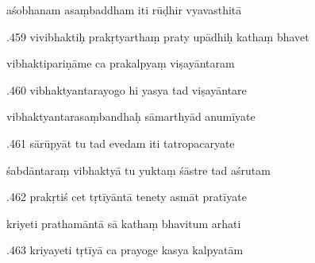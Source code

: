 \documentclass[article,12pt,a4paper]{memoir}%
\newcounter{parCount}
\begin{document}
	  
	  \pstart \leavevmode%
	aśobhanam asaṃbaddham iti rūḍhir vyavasthitā 
	{}
	\pend%
      

	  
	  \pstart {}.459 vivibhaktiḥ prakṛtyarthaṃ praty upādhiḥ kathaṃ bhavet 
	{}
	\pend%
      

	  
	  \pstart \leavevmode%
	vibhaktipariṇāme ca prakalpyaṃ viṣayāntaram 
	{}
	\pend%
      

	  
	  \pstart {}.460 vibhaktyantarayogo hi yasya tad viṣayāntare 
	{}
	\pend%
      

	  
	  \pstart \leavevmode%
	vibhaktyantarasaṃbandhaḥ sāmarthyād anumīyate 
	{}
	\pend%
      

	  
	  \pstart {}.461 sārūpyāt tu tad evedam iti tatropacaryate 
	{}
	\pend%
      

	  
	  \pstart \leavevmode%
	śabdāntaraṃ vibhaktyā tu yuktaṃ śāstre tad aśrutam 
	{}
	\pend%
      

	  
	  \pstart {}.462 prakṛtiś cet tṛtīyāntā tenety asmāt pratīyate 
	{}
	\pend%
      

	  
	  \pstart \leavevmode%
	kriyeti prathamāntā sā kathaṃ bhavitum arhati 
	{}
	\pend%
      

	  
	  \pstart {}.463 kriyayeti tṛtīyā ca prayoge kasya kalpyatām 
	{}
	\pend%
      
\end{document}
